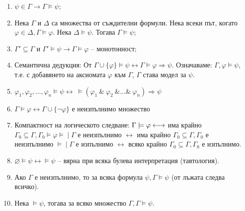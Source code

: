 \documentclass{article}
\newcommand{\mymod}{\models\!\mid}
\begin{document}
\begin{prop}
$\ $

\begin{enumerate}
\item $\psi \in \Gamma \longrightarrow \Gamma \models \psi$;
\item Нека $\Gamma$ и $\Delta$ са множества от съждителни формули. Нека всеки път, когато $\varphi \in \Delta, \Gamma \models \varphi$. Нека $\Delta \models \psi$. Тогава $\Gamma \models \psi$;
\item $\Gamma' \subseteq \Gamma$ и $\Gamma' \models \psi \longrightarrow \Gamma \models \varphi$ -- монотонност;
\item Семантична дедукция: От $\Gamma \cup \{\varphi\} \models \psi \longleftrightarrow \Gamma \models \varphi \Rightarrow \psi$. Означаваме: $\Gamma, \varphi \models \psi$, т.е. с добавянето на аксиомата $\varphi$ към $\Gamma$, $\Gamma$ става модел за $\psi$.
\item $\varphi_1, \varphi_2, \ldots, \varphi_n \models \psi \longleftrightarrow\ \models (\varphi_1\ \&\ \varphi_2\ \& \ldots \&\ \varphi_n) \Rightarrow \psi$
\item $\Gamma \models \varphi \longleftrightarrow \Gamma \cup \{\neg\varphi\}$ е неизпълнимо множество
\item Компактност на логическото следване: $\\ \Gamma \models \varphi \longleftrightarrow$ има крайно $\Gamma_0 \subseteq \Gamma, \Gamma_0 \models \varphi \mymod \Gamma$ е неизпълнимо $\longleftrightarrow$ има крайно $\Gamma_0 \subseteq \Gamma, \Gamma_0$ е неизпълнимо $\mymod \Gamma$ е изпълнимо $\longleftrightarrow$ всяко крайно $\Gamma_0 \subseteq \Gamma, \Gamma_0$ е изпълнимо.
\item $\varnothing \models \psi \longleftrightarrow \models \psi$ -- вярна при всяка булева интерпретация (тавтология).
\item Ако $\Gamma$ е неизпълнимо, то за всяка формула $\psi, \Gamma \models \psi$ (от лъжата следва всичко).
\item Нека $\models \psi$, тогава за всяко множество $\Gamma, \Gamma \models \psi$.
\end{enumerate}



\end{prop}
\end{document}
